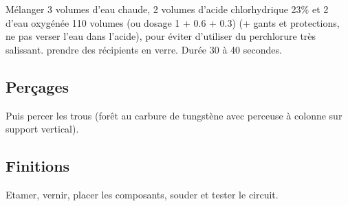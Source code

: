Mélanger 3 volumes d'eau chaude, 2 volumes d'acide chlorhydrique 23\% et 2 d'eau oxygénée 110 volumes (ou dosage 1 + 0.6 + 0.3) (+ gants et protections, ne pas verser l'eau dans l'acide), pour éviter d'utiliser du perchlorure très salissant. prendre des récipients en verre. Durée 30 à 40 secondes.

\subsection{Perçages}
Puis percer les trous (forêt au carbure de tungstène avec perceuse à colonne sur support vertical).

\subsection{Finitions}
Etamer, vernir, placer les composants, souder et tester le circuit.